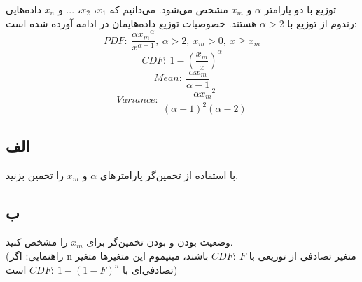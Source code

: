 توزیع   با دو پارامتر $\alpha$ و $x_m$ مشخص می‌شود. می‌دانیم که $x_1$، $x_2$، ... و $x_n$ داده‌هایی رندوم از توزیع  با $\alpha  >2$ هستند. خصوصیات توزیع  داده‌هایمان در ادامه آورده شده است:
$$PDF:\ \frac{\alpha{x_m}^\alpha}{x^{\alpha+1}},\ \alpha>2,\ x_m>0,\ x\geq x_m$$
$$CDF:\ 1 - (\frac{x_m}{x})^\alpha$$
$$Mean:\ \frac{\alpha x_m}{\alpha - 1}$$
$$Variance:\ \frac{\alpha {x_m}^2}{(\alpha - 1)^2(\alpha - 2)}$$

\subsection*{الف}
با استفاده از تخمین‌گر  پارامترهای $\alpha$ و $x_m$ را تخمین بزنید.

\subsection*{ب}
وضعیت  بودن و  بودن تخمین‌گر  برای $x_m$ را مشخص کنید. 
\\(راهنمایی: اگر n متغیر تصادفی  از توزیعی با $CDF:\ F$ باشند، مینیموم این متغیرها متغیر تصادفی‌ای با $CDF:\ 1-(1-F)^n$ است)